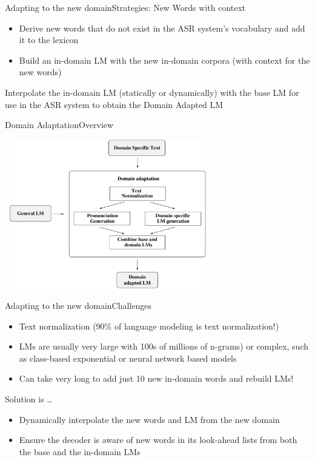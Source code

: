 \begin{frame}{Adapting to the new domain}{Strategies: New Words with context}
\begin{itemize}
\item Derive new words that do not exist in the ASR system's vocabulary and add it to the lexicon 
\item Build an {\color{blue} in-domain LM} with the new in-domain corpora (with context for the new words) 
\end{itemize}

Interpolate the in-domain LM (statically or dynamically) with the base LM for use in the ASR system to obtain  the {\color{red} Domain Adapted LM}

\end{frame}

\begin{frame} {Domain Adaptation}{Overview}
  \begin{center}
    \includegraphics[height=65mm,width=90mm]{figures/DomainAdaptation.pdf}
  \end{center}
\end{frame}


\begin{frame}{Adapting to the new domain}{Challenges}

\begin{itemize}
\item Text normalization (90\% of language modeling is text normalization!)
\item LMs are usually very large with 100s of millions of n-grams) or complex, such as class-based exponential or neural network based models 
\item Can take very long to add just 10 new in-domain words and rebuild LMs! \pause
\end{itemize}
Solution is \ldots
\begin{itemize}
\item  Dynamically interpolate the new words and LM from the new domain
\item  Ensure the decoder is aware of new words in its look-ahead lists from both the base and the in-domain LMs
\end{itemize}

\end{frame}


